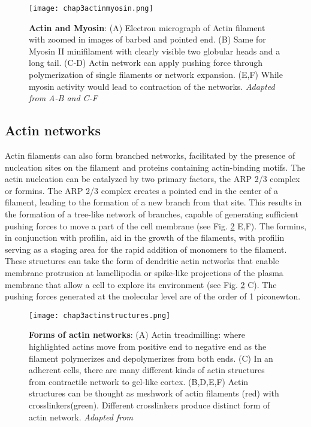 \begin{figure} []
	\centering
	\texttt{[image: chap3actinmyosin.png]}
	\caption{\label{fig_3_1} \textbf{Actin and Myosin}: (A) Electron micrograph of Actin filament with zoomed in images of barbed and pointed end. (B) Same for Myosin II minifilament with clearly visible two globular heads and a long tail. (C-D) Actin network can apply pushing force through polymerization of single filaments or network expansion. (E,F) While myosin activity would lead to contraction of the networks. \textit{Adapted from A-B \cite{alberts2015} and C-F \cite{clarke2021}}
	}
\end{figure}

\hypertarget{actin-networks}{%
	\subsection{Actin networks}\label{actin-networks}}

Actin filaments can also form branched networks, facilitated by the presence of nucleation sites on the filament and proteins containing actin-binding motifs. The actin nucleation can be catalyzed by two primary factors, the ARP 2/3 complex or formins. The ARP 2/3 complex creates a pointed end in the center of a filament, leading to the formation of a new branch from that site. This results in the formation of a tree-like network of branches, capable of generating sufficient pushing forces to move a part of the cell membrane (see Fig. \ref{fig_3_2} E,F). The formins, in conjunction with profilin, aid in the growth of the filaments, with profilin serving as a staging area for the rapid addition of monomers to the filament. These structures can take the form of dendritic actin networks that enable membrane protrusion at lamellipodia or spike-like projections of the plasma membrane that allow a cell to explore its environment (see Fig. \ref{fig_3_2} C). The pushing forces generated at the molecular level are of the order of 1 piconewton.


\begin{figure}[h!]
	\centering
	\texttt{[image: chap3actinstructures.png]}
	\caption{\label{fig_3_2} \textbf{Forms of actin networks}: (A) Actin treadmilling: where highlighted actins move from positive end to negative end as the filament polymerizes and depolymerizes from both ends. (C) In an adherent cells, there are many different kinds of actin structures from contractile network to gel-like cortex. (B,D,E,F) Actin structures can be thought as meshwork of actin filaments (red) with crosslinkers(green). Different crosslinkers produce distinct form of actin network.  \textit{Adapted from \cite{alberts2015}}
	}
\end{figure}

